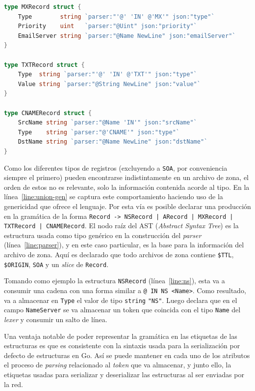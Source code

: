 \begin{lstlisting}[frame=single, language=Go, escapechar=!, caption=Implementación en Go del \textit{parser} para los archivos de zona.]
type MXRecord struct {
	Type        string `parser:"'@' 'IN' @'MX'" json:"type"`
	Priority    uint   `parser:"@Uint" json:"priority"`
	EmailServer string `parser:"@Name NewLine" json:"emailServer"`
}

type TXTRecord struct {
	Type  string `parser:"'@' 'IN' @'TXT'" json:"type"`
	Value string `parser:"@String NewLine" json:"value"`
}

type CNAMERecord struct {
	SrcName string `parser:"@Name 'IN'" json:"srcName"`
	Type    string `parser:"@'CNAME'" json:"type"`
	DstName string `parser:"@Name NewLine" json:"dstName"`
}
\end{lstlisting}

Como los diferentes tipos de registros (excluyendo a \verb|SOA|, por conveniencia siempre el primero) pueden encontrarse indistintamente en un archivo de zona, el orden de estos no es relevante, solo la información contenida acorde al tipo. En la línea~\ref{line:union-gen} se captura este comportamiento haciendo uso de la genericidad que ofrece el lenguaje. Por esta vía es posible declarar una producción en la gramática de la forma \verb+Record -> NSRecord | ARecord | MXRecord | TXTRecord | CNAMERecord+. El nodo raíz del AST (\textit{Abstract Syntax Tree}) es la estructura usada como tipo genérico en la construcción del \textit{parser} (línea~\ref{line:parser}), y en este caso particular, es la base para la información del archivo de zona. Aquí es declarado que todo archivos de zona contiene \verb+$TTL+, \verb|$ORIGIN|, \verb|SOA| y un \textit{slice} de \verb|Record|.

Tomando como ejemplo la estructura \verb+NSRecord+ (línea~\ref{line:ns}), esta va a consumir una cadena con una forma similar a \verb|@ IN NS <Name>|. Como resultado, va a almacenar en \verb|Type| el valor de tipo \verb|string| \verb|"NS"|. Luego declara que en el campo \verb+NameServer+ se va almacenar un token que coincida con el tipo \verb+Name+ del \textit{lexer} y consumir un salto de línea.

Una ventaja notable de poder representar la gramática en las etiquetas de las estructuras es que es consistente con la sintaxis usada para la serialización por defecto de estructuras en Go. Así se puede mantener en cada uno de los atributos el proceso de \textit{parsing} relacionado al \textit{token} que va almacenar, y junto ello, la etiquetas usadas para serializar y deserializar las estructuras al ser enviadas por la red.


